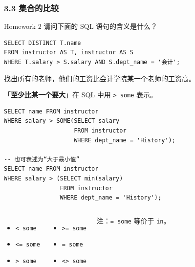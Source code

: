 \documentclass[aspectratio=169, 14pt]{beamer}
\begin{document}
\begin{frame}[fragile]
    \frametitle{3.3 集合的比较}
\begin{block}{Homework 2}
请问下面的 SQL 语句的含义是什么？

\begin{verbatim}
SELECT DISTINCT T.name
FROM instructor AS T, instructor AS S
WHERE T.salary > S.salary AND S.dept_name = '会计';
\end{verbatim}
\end{block}

找出所有的老师，他们的工资比会计学院\alert{某一个}老师的工资高。
\end{frame}

\begin{frame}[fragile]
「\textbf{至少比某一个要大}」在 SQL 中用 \texttt{> some} 表示。

\begin{verbatim}
SELECT name FROM instructor
WHERE salary > SOME(SELECT salary
                    FROM instructor
                    WHERE dept_name = 'History');

-- 也可表述为“大于最小值”
SELECT name FROM instructor
WHERE salary > (SELECT min(salary)
                FROM instructor
                WHERE dept_name = 'History');
\end{verbatim}
    
\end{frame}

\begin{frame}[fragile]
\begin{columns}
    \begin{itemize}
        \item \texttt{< some}
        \item \texttt{<= some}
        \item \texttt{> some}
    \end{itemize}
    \begin{itemize}
        \item \texttt{>= some}
        \item \texttt{= some}
        \item \texttt{<> some}
    \end{itemize}
    注：\texttt{= some} 等价于 \texttt{in}。
\end{columns}

\end{frame}
\end{document}
